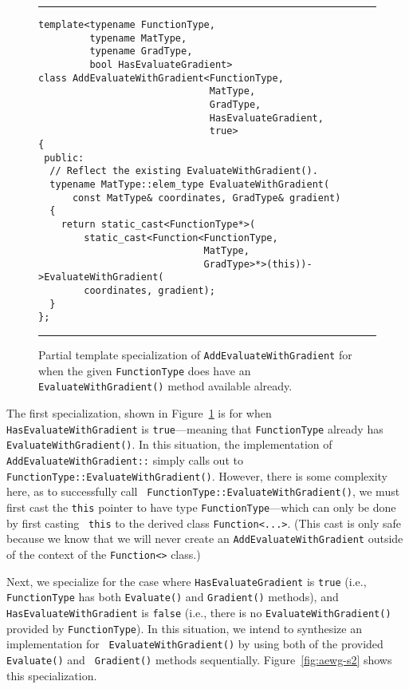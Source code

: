 \begin{figure}[t!]
\hrule
\vspace{1ex}
\begin{verbatim}
template<typename FunctionType,
         typename MatType,
         typename GradType,
         bool HasEvaluateGradient>
class AddEvaluateWithGradient<FunctionType,
                              MatType,
                              GradType,
                              HasEvaluateGradient,
                              true>
{
 public:
  // Reflect the existing EvaluateWithGradient().
  typename MatType::elem_type EvaluateWithGradient(
      const MatType& coordinates, GradType& gradient)
  {
    return static_cast<FunctionType*>(
        static_cast<Function<FunctionType,
                             MatType,
                             GradType>*>(this))->EvaluateWithGradient(
        coordinates, gradient);
  }
};
\end{verbatim}
\hrule
\vspace*{-0.5em}
\caption{Partial template specialization of {\tt AddEvaluateWithGradient} for
when the given {\tt FunctionType} does have an {\tt EvaluateWithGradient()}
method available already.}
\label{fig:aewg-s1}
\end{figure}

The first specialization, shown in Figure~\ref{fig:aewg-s1} is for when {\tt
HasEvaluateWithGradient} is {\tt true}---meaning that {\tt FunctionType} already
has {\tt EvaluateWithGradient()}.  In this situation, the implementation of {\tt
AddEvaluateWithGradient::} simply calls
out to {\tt FunctionType::EvaluateWithGradient()}.  However, there is some
complexity here, as to successfully call {\tt
FunctionType::EvaluateWithGradient()}, we must first cast the {\tt this} pointer
to have type {\tt FunctionType}---which can only be done by first casting {\tt
this} to the derived class {\tt Function<...>}.  (This cast is only safe because
we know that we will never create an {\tt AddEvaluateWithGradient} outside of
the context of the {\tt Function<>} class.)

Next, we specialize for the case where {\tt HasEvaluateGradient} is {\tt true}
(i.e., {\tt FunctionType} has both {\tt Evaluate()} and {\tt Gradient()}
methods), and {\tt HasEvaluateWithGradient} is {\tt false} (i.e., there is no
{\tt EvaluateWithGradient()} provided by {\tt FunctionType}).  In this
situation, we intend to synthesize an implementation for {\tt
EvaluateWithGradient()} by using both of the provided {\tt Evaluate()} and {\tt
Gradient()} methods sequentially.  Figure~\ref{fig:aewg-s2} shows this
specialization.

